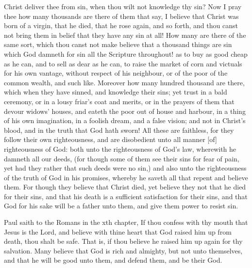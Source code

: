 Christ deliver thee from sin, when thou wilt not knowledge
thy sin? Now I pray thee how many thousands are 
there of them that say, I believe that Christ was born of 
a virgin, that he died, that he rose again, and so forth, and 
thou canst not bring them in belief that they have any sin 
at all! How many are there of the same sort, which thou 
canst not make believe that a thousand things are sin which 
God damneth for sin all the Scripture throughout! as to 
buy as good cheap as he can, and to sell as dear as he can, 
to raise the market of corn and victuals for his own vantage, 
without respect of his neighbour, or of the poor of the common
wealth, and such like. Moreover how many hundred 
thousand are there, which when they have sinned, and 
knowledge their sins; yet trust in a bald ceremony, or in 
a lousy friar's coat and merits, or in the prayers of them
that devour widows' houses, and eateth the poor out of
house and harbour, in a thing of his own imagination, in 
a foolish dream, and a false vision; and not in Christ's 
blood, and in the truth that God hath sworn! All these 
are faithless, for they follow their own righteousness, and 
are disobedient unto all manner [of] righteousness of 
God: both unto the righteousness of God's law, wherewith
he damneth all our deeds, (for though some of them 
see their sins for fear of pain, yet had they rather that 
such deeds were no sin,) and also unto the righteousness 
of the truth of God in his promises, whereby he saveth 
all that repent and believe them. For though they believe 
that Christ died, yet believe they not that he died for their 
sins, and that his death is a sufficient satisfaction for 
their sins, and that God for his sake will be a father unto 
them, and give them power to resist sin. 

Paul saith to the Romans in the xth chapter, If thou
confess with thy mouth that Jesus is the Lord, and 
believe with thine heart that God raised him up from 
death, thou shalt be safe. That is, if thou believe he 
raised him up again for thy salvation. Many believe 
that God is rich and almighty, but not unto themselves, 
and that he will be good unto them, and defend them, 
and be their God. 

